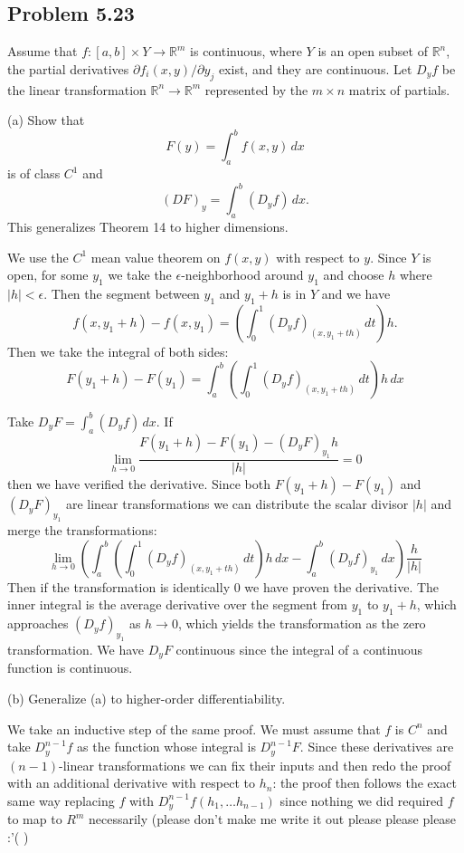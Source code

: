 \documentclass{amsart}
\begin{document}
\newpage

\subsection*{Problem 5.23} Assume that \( f : [a, b] \times Y \to \mathbb{R}^m \) is continuous, where \( Y \) is an open subset of \( \mathbb{R}^n \), the partial derivatives \( \partial f_i(x, y) / \partial y_j \) exist, and they are continuous. Let \( D_y f \) be the linear transformation \( \mathbb{R}^n \to \mathbb{R}^m \) represented by the \( m \times n \) matrix of partials.

(a) Show that
    \[
    F(y) = \int_a^b f(x, y) \, dx
    \]
    is of class \( C^1 \) and
    \[
    (DF)_y = \int_a^b (D_y f) \, dx.
    \]
    This generalizes Theorem 14 to higher dimensions.

\medskip \noindent We use the $C^1$ mean value theorem on $f(x, y)$ with respect to $y$. Since $Y$
is open, for some $y_1$ we take the $\epsilon$-neighborhood around $y_1$ and choose $h$ where $|h|<\epsilon$. 
Then the segment between $y_1$ and $y_1+h$ is in $Y$ and we have \[f(x, y_1+h)-f(x, y_1)=\left(\int^1_0(D_yf)_{(x,y_1+th)}\,dt\right)h.\]
Then we take the integral of both sides: \[F(y_1+h)-F(y_1)= \int_a^b\left(\int^1_0(D_yf)_{(x,y_1+th)}\,dt\right)h\,dx\]

Take $D_yF = \int_a^b (D_y f) \, dx$. If \[\lim_{h\to 0} \frac{F(y_1+h)-F(y_1)-(D_yF)_{y_1}h}{|h|} = 0\] then we have verified the derivative.
Since both $F(y_1+h)-F(y_1)$ and $(D_yF)_{y_1}$ are linear transformations we can distribute the scalar divisor
$|h|$ and merge the transformations: \[\lim_{h\to 0}\left(\int_a^b\left(\int^1_0(D_yf)_{(x,y_1+th)}\,dt\right)h\,dx-\int_a^b(D_yf)_{y_1}\,dx\right)\frac{h}{|h|}\]
Then if the transformation is identically $0$ we have proven the derivative. The inner integral is the average derivative over the segment from
$y_1$ to $y_1+h$, which approaches $(D_yf)_{y_1}$ as $h\to 0$, which yields the transformation as the zero transformation. We have 
$D_yF$ continuous since the integral of a continuous function is continuous. 


\bigskip

(b) Generalize (a) to higher-order differentiability.

\medskip \noindent We take an inductive step of the same proof. We must assume that $f$ is $C^n$ and take $D^{n-1}_yf$
as the function whose integral is $D^{n-1}_yF$. Since these derivatives are $(n-1)$-linear transformations we can
fix their inputs and then redo the proof with an additional derivative with respect to $h_n$: the proof then follows the exact
same way replacing $f$ with $D^{n-1}_yf(h_1,\dots h_{n-1})$ since nothing we did required $f$ to map to $R^m$ necessarily (please don't make me write it out please please please :'( )
\end{document}
